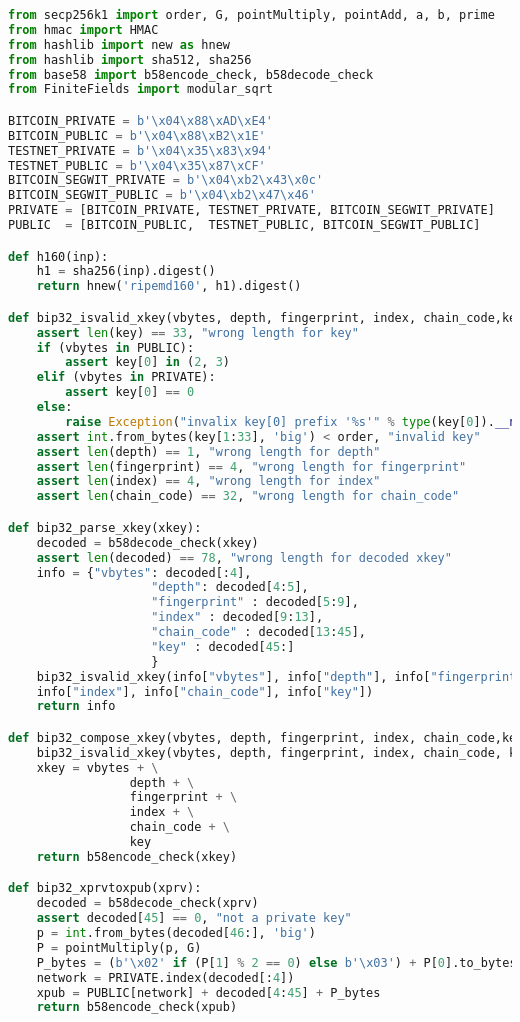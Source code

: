 \begin{lstlisting}[language=Python]
from secp256k1 import order, G, pointMultiply, pointAdd, a, b, prime
from hmac import HMAC
from hashlib import new as hnew
from hashlib import sha512, sha256
from base58 import b58encode_check, b58decode_check
from FiniteFields import modular_sqrt

BITCOIN_PRIVATE = b'\x04\x88\xAD\xE4'
BITCOIN_PUBLIC = b'\x04\x88\xB2\x1E'
TESTNET_PRIVATE = b'\x04\x35\x83\x94'
TESTNET_PUBLIC = b'\x04\x35\x87\xCF'
BITCOIN_SEGWIT_PRIVATE = b'\x04\xb2\x43\x0c'
BITCOIN_SEGWIT_PUBLIC = b'\x04\xb2\x47\x46'
PRIVATE = [BITCOIN_PRIVATE, TESTNET_PRIVATE, BITCOIN_SEGWIT_PRIVATE]
PUBLIC  = [BITCOIN_PUBLIC,  TESTNET_PUBLIC, BITCOIN_SEGWIT_PUBLIC]

def h160(inp):
	h1 = sha256(inp).digest()
	return hnew('ripemd160', h1).digest()

def bip32_isvalid_xkey(vbytes, depth, fingerprint, index, chain_code,key):
	assert len(key) == 33, "wrong length for key"
	if (vbytes in PUBLIC):
		assert key[0] in (2, 3)
	elif (vbytes in PRIVATE):
		assert key[0] == 0
	else:
		raise Exception("invalix key[0] prefix '%s'" % type(key[0]).__name__)
	assert int.from_bytes(key[1:33], 'big') < order, "invalid key"
	assert len(depth) == 1, "wrong length for depth"
	assert len(fingerprint) == 4, "wrong length for fingerprint"
	assert len(index) == 4, "wrong length for index"
	assert len(chain_code) == 32, "wrong length for chain_code"

def bip32_parse_xkey(xkey):
	decoded = b58decode_check(xkey)
	assert len(decoded) == 78, "wrong length for decoded xkey"
	info = {"vbytes": decoded[:4],
					"depth": decoded[4:5],
					"fingerprint" : decoded[5:9],
					"index" : decoded[9:13],
					"chain_code" : decoded[13:45],
					"key" : decoded[45:]
					}
	bip32_isvalid_xkey(info["vbytes"], info["depth"], info["fingerprint"], \
	info["index"], info["chain_code"], info["key"])
	return info

def bip32_compose_xkey(vbytes, depth, fingerprint, index, chain_code,key):
	bip32_isvalid_xkey(vbytes, depth, fingerprint, index, chain_code, key)
	xkey = vbytes + \
 				 depth + \
 				 fingerprint + \
 				 index + \
 				 chain_code + \
 				 key
	return b58encode_check(xkey)

def bip32_xprvtoxpub(xprv):
	decoded = b58decode_check(xprv)
	assert decoded[45] == 0, "not a private key"
	p = int.from_bytes(decoded[46:], 'big')
	P = pointMultiply(p, G)
	P_bytes = (b'\x02' if (P[1] % 2 == 0) else b'\x03') + P[0].to_bytes(32, 'big')
	network = PRIVATE.index(decoded[:4])
	xpub = PUBLIC[network] + decoded[4:45] + P_bytes
	return b58encode_check(xpub)


\end{lstlisting}

